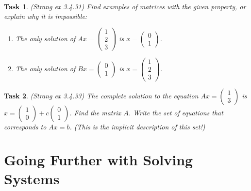 \documentclass[10pt,]{book}
\theoremstyle{plain}
\numberwithin{equation}{section}
\newtheorem{task}{Task}[chapter]
\begin{document}
\begin{task}
\label{task-106}
(Strang ex 3.4.31)
        Find examples of matrices with the given property, or explain why it is
        impossible:
        \begin{enumerate}
\item{}
            The only solution of \(Ax = \left(\begin{smallmatrix}
            1 \\ 2 \\ 3 \end{smallmatrix}\right)\) is \(x = \left(\begin{smallmatrix}
            0 \\ 1 \end{smallmatrix}\right)\).
          \item{}
            The only solution of \(Bx = \left(\begin{smallmatrix}
            0 \\ 1 \end{smallmatrix}\right)\) is
            \(x = \left(\begin{smallmatrix}
            1 \\ 2 \\ 3 \end{smallmatrix}\right)\).
          \end{enumerate}
\end{task}
\begin{task}
\label{task-107}
(Strang ex 3.4.33)
        The complete solution to the equation \(Ax = \left(\begin{smallmatrix}
        1 \\ 3\end{smallmatrix}\right)\) is \(x = \left(\begin{smallmatrix}
        1 \\ 0\end{smallmatrix}\right) +
        c\left(\begin{smallmatrix}0\\ 1 \end{smallmatrix}\right)\).
        Find the matrix \(A\). Write the set of equations that corresponds to
        \(Ax = b\). (This is the \emph{implicit} description of this set!)
      \end{task}
\clearpage
\typeout{************************************************}
\typeout{************************************************}
\section[Going Further with Solving Systems]{Going Further with Solving Systems}\label{soln-gf}
\typeout{************************************************}
\typeout{************************************************}
\end{document}
